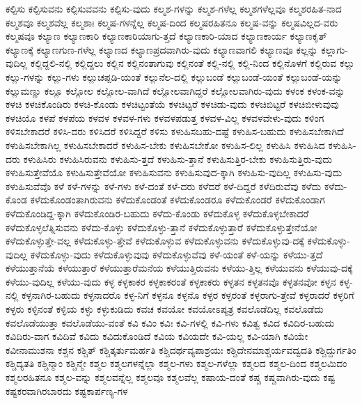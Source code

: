 {ಕಲ್ಪಿಸು
ಕಲ್ಪಿಸುವನು
ಕಲ್ಪಿಸುವವನು
ಕಲ್ಪಿಸು-ವುದು
ಕಲ್ಮಶ-ಗಳನ್ನು
ಕಲ್ಮಶ-ಗಳೆಲ್ಲ
ಕಲ್ಮಶಗಳೆಲ್ಲವೂ
ಕಲ್ಮಶರಹಿತ-ನಾದ
ಕಲ್ಮಶವೂ
ಕಲ್ಮಶವೆಲ್ಲ
ಕಲ್ಮಶಾಃ
ಕಲ್ಮಷ-ಗಳನ್ನೆಲ್ಲ
ಕಲ್ಮಷ-ದಿಂದ
ಕಲ್ಮಷರಹಿತನೂ
ಕಲ್ಮಷ-ವನ್ನು
ಕಲ್ಮಷವಿಲ್ಲದ-ವರು
ಕಲ್ಮಷವೂ
ಕಲ್ಯಾಣ
ಕಲ್ಯಾಣಕಾರಿ
ಕಲ್ಯಾಣಕಾರಿಯಾಗು-ತ್ತದೆ
ಕಲ್ಯಾಣಕಾರಿ-ಯಾದ
ಕಲ್ಯಾಣಕಾರ್ಯ
ಕಲ್ಯಾಣಕೃತ್
ಕಲ್ಯಾಣಕ್ಕೆ
ಕಲ್ಯಾಣಗುಣ-ಗಳೆಲ್ಲ
ಕಲ್ಯಾಣದ
ಕಲ್ಯಾಣಪ್ರದವಾಗಿರು-ವುದು
ಕಲ್ಯಾಣವಾಗಲಿ
ಕಲ್ಯಾಣವೂ
ಕಲ್ಲನ್ನು
ಕಲ್ಲಾಗು-ವುದಿಲ್ಲ
ಕಲ್ಲಿದ್ದಲಿ-ನಲ್ಲಿ
ಕಲ್ಲಿದ್ದಲು
ಕಲ್ಲಿನ
ಕಲ್ಲಿನಂತಾಗುವು
ಕಲ್ಲಿನಂತೆ
ಕಲ್ಲಿ-ನಲ್ಲಿ
ಕಲ್ಲಿ-ನಿಂದ
ಕಲ್ಲಿನೊಳಗೆ
ಕಲ್ಲಿರುವ
ಕಲ್ಲು
ಕಲ್ಲು-ಗಳನ್ನು
ಕಲ್ಲು-ಗಳು
ಕಲ್ಲುಚಪ್ಪಡಿ-ಯಂತೆ
ಕಲ್ಲುನೆಲ-ದಲ್ಲಿ
ಕಲ್ಲುಬಂಡೆ
ಕಲ್ಲುಬಂಡೆ-ಯಂತೆ
ಕಲ್ಲುಬಂಡೆ-ಯನ್ನು
ಕಲ್ಲುಮಣ್ಣು
ಕಲ್ಲೂ
ಕಲ್ಲೋಲ
ಕಲ್ಲೋಲ-ವಾಗಿದೆ
ಕಲ್ಲೋಲವಾಗಿದ್ದರೆ
ಕಲ್ಲೋಲವಾಗಿರು-ವುದು
ಕಳಂಕ
ಕಳಂಕ-ವನ್ನು
ಕಳಚಿ
ಕಳಚಿಕೊಂಡಿರು
ಕಳಚಿ-ಕೊಂಡು
ಕಳಚಿಟ್ಟಂತೆಯೆ
ಕಳಚಿಟ್ಟರೆ
ಕಳಚಿಡು-ವುದು
ಕಳಚಿಬಿಟ್ಟರೆ
ಕಳಚಿಬೀಳುವುವು
ಕಳಚಿಯೊ
ಕಳಪೆ
ಕಳಪೆಯ
ಕಳವಳ
ಕಳವಳ-ಗಳು
ಕಳವಳಪಡುತ್ತ
ಕಳವಳ-ವಿಲ್ಲ
ಕಳವಳವೇಳು-ವುದು
ಕಳಿಂಗ
ಕಳಿಸಬೇಕಾದರೆ
ಕಳಿಸಿ-ದರು
ಕಳಿಸಿದರೆ
ಕಳಿಸಿದ್ದರೆ
ಕಳಿಸು
ಕಳುಹಿಸಬಹು-ದಷ್ಟೆ
ಕಳುಹಿಸ-ಬಹುದು
ಕಳುಹಿಸಬೇಕಾಗಿದೆ
ಕಳುಹಿಸಬೇಕಾಗಿಲ್ಲ
ಕಳುಹಿಸಬೇಕಾದರೆ
ಕಳುಹಿಸ-ಬೇಕು
ಕಳುಹಿಸಬೇಕೋ
ಕಳುಹಿಸ-ಲಿಲ್ಲ
ಕಳುಹಿಸಿ
ಕಳುಹಿಸಿದ
ಕಳುಹಿಸಿ-ದರು
ಕಳುಹಿಸಿರು
ಕಳುಹಿಸಿರುವನು
ಕಳುಹಿಸು-ತ್ತದೆ
ಕಳುಹಿಸು-ತ್ತಾನೆ
ಕಳುಹಿಸುತ್ತಿರ-ಬೇಕು
ಕಳುಹಿಸುತ್ತಿರು-ವುದು
ಕಳುಹಿಸುತ್ತೇವೆಯೊ
ಕಳುಹಿಸುತ್ತೇವೆಯೋ
ಕಳುಹಿಸುವನು
ಕಳುಹಿಸುವುದ-ಕ್ಕಾಗಿ
ಕಳುಹಿಸು-ವುದಿಲ್ಲ
ಕಳುಹಿಸು-ವುದು
ಕಳುಹಿಸುವೆವೊ
ಕಳೆ
ಕಳೆ-ಗಳನ್ನು
ಕಳೆ-ಗಳು
ಕಳೆ-ದಂತೆ
ಕಳೆ-ದರು
ಕಳೆದರೆ
ಕಳೆ-ದಿದ್ದರೆ
ಕಳೆದಿರುವೆವು
ಕಳೆದು
ಕಳೆದು-ಕೊಂಡ
ಕಳೆದುಕೊಂಡಂತಾಗಿರುವನು
ಕಳೆದುಕೊಂಡಂತೆ
ಕಳೆದುಕೊಂಡರೂ
ಕಳೆದುಕೊಂಡರೆ
ಕಳೆದುಕೊಂಡಾಗ
ಕಳೆದುಕೊಂಡಿದ್ದ-ಕ್ಕಾಗಿ
ಕಳೆದುಕೊಂಡಿರ-ಬಹುದು
ಕಳೆದು-ಕೊಂಡು
ಕಳೆದುಕೊಳ್ಳ
ಕಳೆದುಕೊಳ್ಳಬೇಕಾದರೆ
ಕಳೆದುಕೊಳ್ಳಲೆತ್ನಿಸುವನು
ಕಳೆದು-ಕೊಳ್ಳು
ಕಳೆದುಕೊಳ್ಳು-ತ್ತಾನೆ
ಕಳೆದುಕೊಳ್ಳುತ್ತಾರೆ
ಕಳೆದುಕೊಳ್ಳುತ್ತೇನೆಯೋ
ಕಳೆದುಕೊಳ್ಳುತ್ತೇ-ವಲ್ಲ
ಕಳೆದುಕೊಳ್ಳು-ತ್ತೇವೆ
ಕಳೆದುಕೊಳ್ಳುವ
ಕಳೆದುಕೊಳ್ಳುವನು
ಕಳೆದುಕೊಳ್ಳುವು-ದಕ್ಕೆ
ಕಳೆದುಕೊಳ್ಳು-ವುದಿಲ್ಲ
ಕಳೆದುಕೊಳ್ಳು-ವುದು
ಕಳೆದುಕೊಳ್ಳುವುವು
ಕಳೆದುಕೊಳ್ಳುವೆವು
ಕಳೆ-ಯಂತೆ
ಕಳೆ-ಯನ್ನು
ಕಳೆಯು-ತ್ತದೆ
ಕಳೆಯುತ್ತಾನೆಯೆ
ಕಳೆಯುತ್ತಾರೆ
ಕಳೆಯುತ್ತಾರೆಮನೆಯ
ಕಳೆಯುತ್ತಿರುವನು
ಕಳೆಯು-ತ್ತಿಲ್ಲ
ಕಳೆಯುವನು
ಕಳೆಯುವು-ದಕ್ಕೆ
ಕಳೆಯು-ವುದಿಲ್ಲ
ಕಳೆಯು-ವುದು
ಕಳ್ಳ
ಕಳ್ಳಕಾಕರ
ಕಳ್ಳಕಾಕರಂತೆ
ಕಳ್ಳಕಾಕರು
ಕಳ್ಳತನ
ಕಳ್ಳತನವೊ
ಕಳ್ಳತನವೋ
ಕಳ್ಳನ
ಕಳ್ಳ-ನಲ್ಲಿ
ಕಳ್ಳನಾಗಿರ-ಬಹುದು
ಕಳ್ಳನಾದರೊ
ಕಳ್ಳ-ನಿಗೆ
ಕಳ್ಳನೂ
ಕಳ್ಳನೊ
ಕಳ್ಳರ
ಕಳ್ಳರಂತೆ
ಕಳ್ಳರಾಗು-ತ್ತೇವೆ
ಕಳ್ಳರಾದರೆ
ಕಳ್ಳರಿಗೆ
ಕಳ್ಳರು
ಕಳ್ಳಿನಂತೆ
ಕಳ್ಳಿಯ
ಕಳ್ಳು
ಕಳ್ಳುಕುಡಿದು
ಕವಚ
ಕವಯೋ
ಕವಯೋಽಪ್ಯತ್ರ
ಕವಲೊಡೆದಿಲ್ಲ
ಕವಲೊಡೆದು
ಕವಲೊಡೆಯುತ್ತಾ
ಕವಲೊಡೆಯು-ವಂತೆ
ಕವಿ
ಕವಿಂ
ಕವಿಃ
ಕವಿ-ಗಳಲ್ಲಿ
ಕವಿ-ಗಳು
ಕವಿತ್ವ
ಕವಿದ
ಕವಿದಿರ-ಬಹುದು
ಕವಿದಿರು-ವಾಗ
ಕವಿದಿವೆ
ಕವಿದು
ಕವಿದುಕೊಂಡಿದೆ
ಕವಿಯ
ಕವಿಯದೇ
ಕವಿ-ಯಲ್ಲ
ಕವಿ-ಯಾಗಿ
ಕವಿಯೇ
ಕವೀನಾಮುಶನಾ
ಕಶ್ಚನ
ಕಶ್ಚಿತ್
ಕಶ್ಚಿತ್ಕರ್ತುಮರ್ಹತಿ
ಕಶ್ಚಿದರ್ಥವ್ಯಪಾಶ್ರಯಃ
ಕಶ್ಚಿದೇನಮಾಶ್ಚರ್ಯವದ್ವದತಿ
ಕಶ್ಚಿದ್ದುರ್ಗತಿಂ
ಕಶ್ಚಿದ್ಯತತಿ
ಕಶ್ಚಿನ್ಮಾಂ
ಕಶ್ಚಿನ್ಮೇ
ಕಶ್ಮಲ
ಕಶ್ಮಲಗಳನ್ನೆಲ್ಲಾ
ಕಶ್ಮಲ-ಗಳು
ಕಶ್ಮಲ-ಗಳೆಲ್ಲಾ
ಕಶ್ಮಲದ
ಕಶ್ಮಲ-ದಿಂದ
ಕಶ್ಮಲಮಿದಂ
ಕಶ್ಮಲರಹಿತನೂ
ಕಶ್ಮಲ-ವನ್ನು
ಕಶ್ಮಲವನ್ನೆಲ್ಲ
ಕಶ್ಮಲವೂ
ಕಶ್ಮಲವೆಲ್ಲ
ಕಷಾಯ-ದಂತೆ
ಕಷ್ಚ
ಕಷ್ಚವಾಗಿರು-ವುದು
ಕಷ್ಟ
ಕಷ್ಟಕರವಾಗಿರಬಾರದು
ಕಷ್ಟಕಾರ್ಪಣ್ಯ-ಗಳ
}

